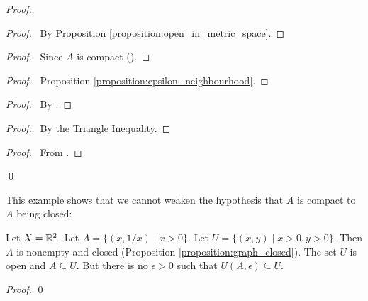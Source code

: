 \begin{proof}
    \pf
    \begin{proof}
        \pf\ By Proposition \ref{proposition:open_in_metric_space}.
    \end{proof}
    \begin{proof}
        \pf\ Since $A$ is compact ().
    \end{proof}
    \begin{proof}
        \pf\ Proposition \ref{proposition:epsilon_neighbourhood}.
    \end{proof}
    \begin{proof}
        \pf\ By .
    \end{proof}
    \begin{proof}
        \pf\ By the Triangle Inequality.
    \end{proof}
    \begin{proof}
        \pf\ From .
    \end{proof}
    \qed
\end{proof}

This example shows that we cannot weaken the hypothesis that $A$ is compact
to $A$ being closed:

\begin{example}
    Let $X = \mathbb{R}^2$. Let $A = \{ (x, 1/x) \mid x > 0 \}$.
    Let $U = \{ (x,y) \mid x > 0, y > 0 \}$. Then $A$ is nonempty
    and closed (Proposition \ref{proposition:graph_closed}).
    The set $U$ is open and $A \subseteq U$. But there is no $\epsilon > 0$
    such that $U(A, \epsilon) \subseteq U$.

    \begin{proof}
        \pf
        \qed
    \end{proof}
\end{example}

